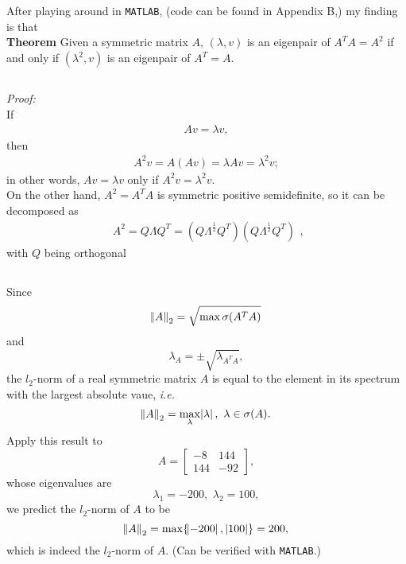 \documentclass[11pt]{article}
\begin{document}
\section{}
\subsection{}
After playing around in \texttt{MATLAB}, (code can be found in Appendix B,) my finding is that \\[0.4cm] 
\textbf{Theorem} Given a symmetric matrix $A$, $(\lambda, v)$ is an eigenpair of $A^TA=A^2$ if and only if $(\lambda^2, v)$ is an eigenpair of $A^T=A$. \\[0.4cm]
\subsection{}
\textit{Proof:}\\[0.4cm]
If 
\begin{equation}\begin{split} Av = \lambda v, \end{split}\nonumber\end{equation}
then
\begin{equation}\begin{split} A^2v=A(Av)=\lambda Av = \lambda^2v;\end{split}\nonumber\end{equation}
in other words, $Av=\lambda v$ only if $A^2v = \lambda^2v$.\\[0.3cm]
On the other hand, $A^2=A^TA$ is symmetric positive semidefinite, so it can be decomposed as
\begin{equation}\begin{split} A^2 = Q\Lambda Q^T = (Q\Lambda^{\frac12}Q^T)(Q\Lambda^{\frac12}Q^T)\end{split},\nonumber\end{equation}
with $Q$ being orthogonal

\subsection{}
Since $$\norm{A}_2 = \sqrt{\max\sigma(A^TA)}$$ and $$\lambda_{A} = \pm\sqrt{\lambda_{A^TA}},$$ the $l_2$-norm of a real symmetric matrix $A$ is equal to the element in its spectrum with the largest absolute vaue, \textit{i.e.} $$\norm{A}_2 = \max_{\lambda}\abs{\lambda},\,\,\lambda\in\sigma(A).$$ 
Apply this result to $$A = \begin{bmatrix} -8 & 144\\144 & -92\end{bmatrix}, $$ 
whose eigenvalues are $$\lambda_1 = -200,\,\,\lambda_2 = 100,$$
we predict the $l_2$-norm of $A$ to be 
$$\norm{A}_2 = \max\{\abs{-200},\,\abs{100}\} = 200,$$
which is indeed the $l_2$-norm of $A$. (Can be verified with \texttt{MATLAB}.)
\end{document}
